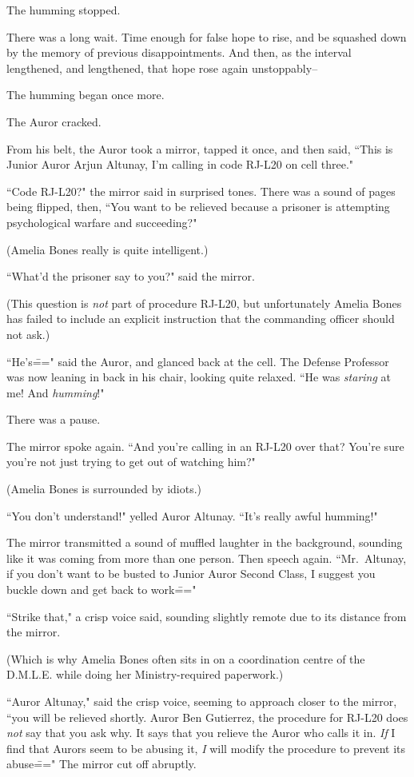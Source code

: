 The humming stopped.

There was a long wait. Time enough for false hope to rise, and be squashed down by the memory of previous disappointments. And then, as the interval lengthened, and lengthened, that hope rose again unstoppably\---

The humming began once more.

The Auror cracked.

From his belt, the Auror took a mirror, tapped it once, and then said, ``This is Junior Auror Arjun Altunay, I'm calling in code RJ-L20 on cell three."

``Code RJ-L20?" the mirror said in surprised tones. There was a sound of pages being flipped, then, ``You want to be relieved because a prisoner is attempting psychological warfare and succeeding?"

(Amelia Bones really is quite intelligent.)

``What'd the prisoner say to you?" said the mirror.

(This question is \emph{not} part of procedure RJ-L20, but unfortunately Amelia Bones has failed to include an explicit instruction that the commanding officer should not ask.)

``He's\===" said the Auror, and glanced back at the cell. The Defense Professor was now leaning in back in his chair, looking quite relaxed. ``He was \emph{staring} at me! And \emph{humming}!"

There was a pause.

The mirror spoke again. ``And you're calling in an RJ-L20 over that? You're sure you're not just trying to get out of watching him?"

(Amelia Bones is surrounded by idiots.)

``You don't understand!" yelled Auror Altunay. ``It's really awful humming!"

The mirror transmitted a sound of muffled laughter in the background, sounding like it was coming from more than one person. Then speech again. ``Mr.~Altunay, if you don't want to be busted to Junior Auror Second Class, I suggest you buckle down and get back to work\==="

``Strike that," a crisp voice said, sounding slightly remote due to its distance from the mirror.

(Which is why Amelia Bones often sits in on a coordination centre of the D.M.L.E. while doing her Ministry-required paperwork.)

``Auror Altunay," said the crisp voice, seeming to approach closer to the mirror, ``you will be relieved shortly. Auror Ben Gutierrez, the procedure for RJ-L20 does \emph{not} say that you ask why. It says that you relieve the Auror who calls it in. \emph{If} I find that Aurors seem to be abusing it, \emph{I} will modify the procedure to prevent its abuse\===" The mirror cut off abruptly.

